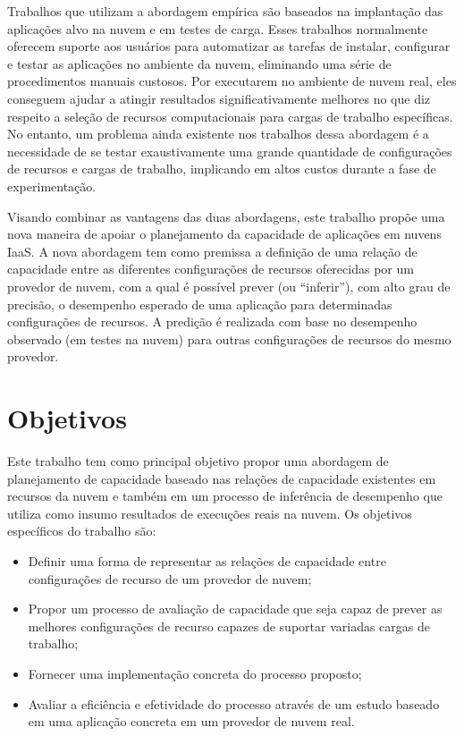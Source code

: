 Trabalhos que utilizam a abordagem empírica são baseados na implantação das aplicações alvo na nuvem 
e em testes de carga. Esses trabalhos normalmente oferecem suporte aos usuários
para automatizar as tarefas de instalar, configurar e testar as aplicações no
ambiente da nuvem, eliminando uma série de procedimentos manuais custosos. Por
executarem no ambiente de nuvem real, eles conseguem ajudar a atingir resultados
significativamente melhores no que diz respeito a seleção de recursos
computacionais para cargas de trabalho específicas. No entanto, um problema ainda 
existente nos trabalhos dessa abordagem é a necessidade de se testar exaustivamente uma grande 
quantidade de configurações de recursos e cargas de trabalho, implicando em altos 
custos durante a fase de experimentação.

Visando combinar as vantagens das duas abordagens, este trabalho
propõe uma nova maneira de apoiar o planejamento da capacidade de aplicações
em nuvens IaaS. A nova abordagem tem como premissa a definição de uma relação 
de capacidade entre as diferentes configurações de recursos oferecidas por um 
provedor de nuvem, com a qual é possível prever (ou ``inferir''), com alto grau 
de precisão, o desempenho esperado de uma aplicação para determinadas configurações 
de recursos. A predição é realizada com base no desempenho observado (em testes 
na nuvem) para outras configurações de recursos do mesmo provedor.

\section{Objetivos}
Este trabalho tem como principal objetivo propor uma abordagem de
planejamento de capacidade baseado nas relações de capacidade existentes em
recursos da nuvem e também em um processo de inferência de desempenho 
que utiliza como insumo resultados de execuções reais na nuvem. Os objetivos
específicos do trabalho são:

\begin{itemize}
  \item Definir uma forma de representar as relações de capacidade entre
  configurações de recurso de um provedor de nuvem;
  \item Propor um processo de avaliação de capacidade que seja capaz de 
  prever as melhores configurações de recurso capazes de suportar variadas
  cargas de trabalho;
  \item Fornecer uma implementação concreta do processo proposto;
  \item Avaliar a eficiência e efetividade do processo através de um estudo
  baseado em uma aplicação concreta em um provedor de nuvem real.
\end{itemize}
 
